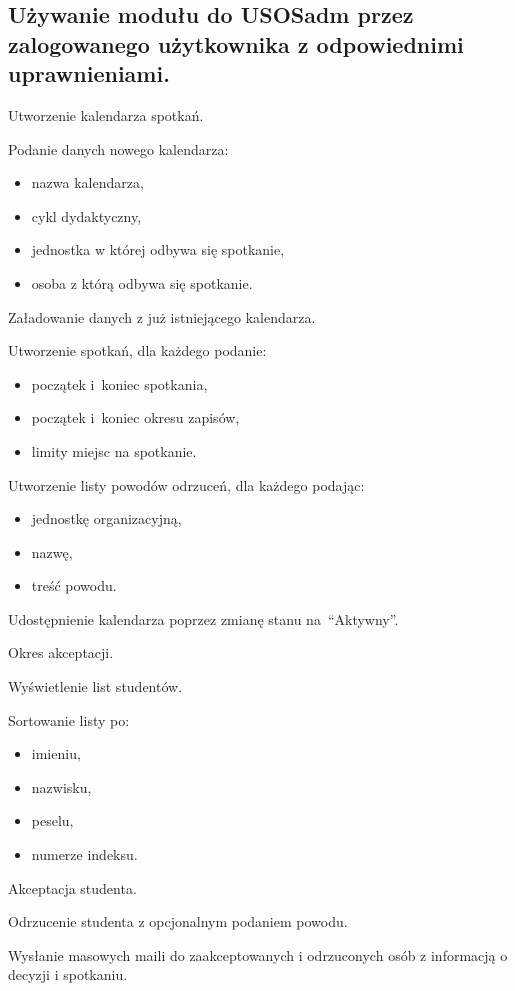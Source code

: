 \documentclass[licencjacka]{pracamgr}
\begin{document}
\subsection{Używanie modułu do USOSadm przez zalogowanego użytkownika z odpowiednimi uprawnieniami.}
	\begin{step}
		\item Utworzenie kalendarza spotkań.
			\begin{step}
				\item Podanie danych nowego kalendarza:
					\begin{itemize}
						\item nazwa kalendarza,
						\item cykl dydaktyczny,
						\item jednostka w której odbywa się spotkanie,
						\item osoba z którą odbywa się spotkanie.
					\end{itemize} 
				\item Załadowanie danych z już istniejącego kalendarza.
			\end{step}
				\item Utworzenie spotkań, dla każdego podanie:
					\begin{itemize}
						\item początek i~koniec spotkania,
						\item początek i~koniec okresu zapisów,
						\item limity miejsc na spotkanie.
					\end{itemize}
				\item Utworzenie listy powodów odrzuceń, dla każdego podając:
					\begin{itemize}
						\item jednostkę organizacyjną,
						\item nazwę,
						\item treść powodu.
					\end{itemize}
		\item Udostępnienie kalendarza poprzez zmianę stanu na~\enquote{Aktywny}.
		\item Okres akceptacji.
			\begin{step}
				\item Wyświetlenie list studentów.
					\begin{step}
						\item Sortowanie listy po:
							\begin{itemize}
								\item imieniu,
								\item nazwisku,
								\item peselu,
								\item numerze indeksu.
						 	\end{itemize}
					\end{step}
				\item Akceptacja studenta.
				\item Odrzucenie studenta z opcjonalnym podaniem powodu.
				\item Wysłanie masowych maili do zaakceptowanych i odrzuconych osób z informacją o decyzji i spotkaniu.
			\end{step}
	\end{step}
	
\end{document}
